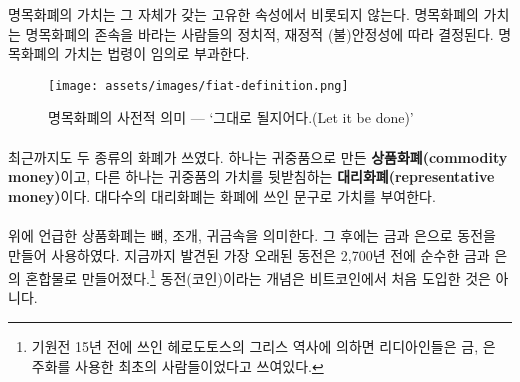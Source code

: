 \begin{comment}
	The value of fiat money does not stem from its inherent properties. How
	good a certain type of fiat money is, is only correlated to the
	political and fiscal (in)stability of those who dream it into existence.
	Its value is imposed by decree, arbitrarily.
\end{comment}
명목화폐의 가치는 그 자체가 갖는 고유한 속성에서 비롯되지 않는다.
명목화폐의 가치는 명목화폐의 존속을 바라는 사람들의 정치적, 재정적 (불)안정성에 따라 결정된다.
명목화폐의 가치는 법령이 임의로 부과한다.

\begin{figure}
	\centering
	\texttt{[image: assets/images/fiat-definition.png]}
	\caption{명목화폐의 사전적 의미 --- `그대로 될지어다.(Let it be done)'}
	\label{fig:fiat-definition}
\end{figure}

\paragraph{}
최근까지도 두 종류의 화폐가 쓰였다.
하나는 귀중품으로 만든 \textbf{상품화폐(commodity money)}이고, 
다른 하나는 귀중품의 가치를 뒷받침하는 \textbf{대리화폐(representative money)}이다.
대다수의 대리화폐는 화폐에 쓰인 문구로 가치를 부여한다.

\paragraph{}
\begin{comment}
	We already touched on commodity money above. People used special bones,
	seashells, and precious metals as money. Later on, mainly coins made out of
	precious metals like gold and silver were used as money. The oldest coin found
	so far is made of a natural gold-and-silver mix and was made more than 2700
	years ago.\footnote{According to the Greek historian Herodotus, writing in the
		fifth century BC, the Lydians were the first people to have used gold and silver
		coinage. \cite{coinage-origins}} If something is new in Bitcoin, the concept of
	a coin is not it.
\end{comment}
위에 언급한 상품화폐는 뼈, 조개, 귀금속을 의미한다. 
그 후에는 금과 은으로 동전을 만들어 사용하였다.
지금까지 발견된 가장 오래된 동전은 2,700년 전에 순수한 금과 은의 혼합물로 만들어졌다.\footnote{기원전 15년 전에 쓰인 헤로도토스의 그리스 역사에 의하면 리디아인들은 금, 은 주화를 사용한 최초의 사람들이었다고 쓰여있다.\cite{coinage-origins}}
동전(코인)이라는 개념은 비트코인에서 처음 도입한 것은 아니다.


